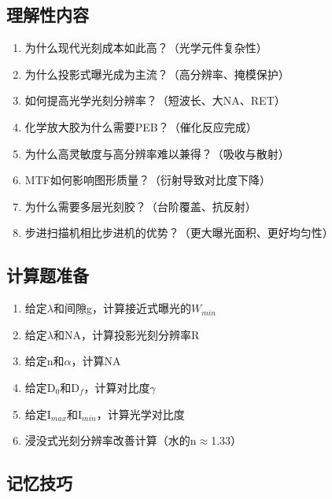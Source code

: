 \documentclass[UTF8,12pt,a4paper]{ctexart}
\begin{document}
\subsection{理解性内容}

\begin{enumerate}
    \item 为什么现代光刻成本如此高？（光学元件复杂性）
    \item 为什么投影式曝光成为主流？（高分辨率、掩模保护）
    \item 如何提高光学光刻分辨率？（短波长、大NA、RET）
    \item 化学放大胶为什么需要PEB？（催化反应完成）
    \item 为什么高灵敏度与高分辨率难以兼得？（吸收与散射）
    \item MTF如何影响图形质量？（衍射导致对比度下降）
    \item 为什么需要多层光刻胶？（台阶覆盖、抗反射）
    \item 步进扫描机相比步进机的优势？（更大曝光面积、更好均匀性）
\end{enumerate}

\subsection{计算题准备}

\begin{enumerate}
    \item 给定$\lambda$和间隙g，计算接近式曝光的$W_{min}$
    \item 给定$\lambda$和NA，计算投影光刻分辨率R
    \item 给定n和$\alpha$，计算NA
    \item 给定D$_0$和D$_f$，计算对比度$\gamma$
    \item 给定I$_{max}$和I$_{min}$，计算光学对比度
    \item 浸没式光刻分辨率改善计算（水的n$\approx$1.33）
\end{enumerate}

\subsection{记忆技巧}
\end{document}
